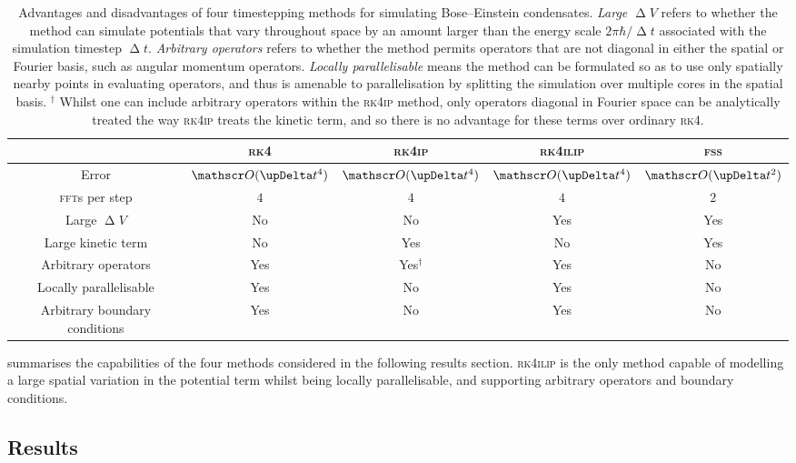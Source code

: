 \begin{table}
\renewcommand{\arraystretch}{1.5}
\setlength\heavyrulewidth{1.5pt}
\centering
\begin{tabular}[c]{ccccc}
\toprule
 & \textsc{rk4} & \textsc{rk4ip} & \textsc{rk4ilip} & \textsc{fss} \\
\midrule
Error & $\Ord{\upDelta t^4}$ & $\Ord{\upDelta t^4}$& $\Ord{\upDelta t^4}$ & $\Ord{\upDelta t^2}$\\
\textsc{fft}s per step & $4$ & $4$ & $4$ & $2$\\
Large $\upDelta V$ & No & No & Yes & Yes\\
Large kinetic term & No & Yes & No & Yes\\
Arbitrary operators & Yes & Yes$^\dagger$ & Yes & No\\
Locally parallelisable & Yes & No & Yes & No\\
Arbitrary boundary conditions & Yes & No & Yes & No\\
\bottomrule
\end{tabular}
\caption{Advantages and disadvantages of four timestepping methods for simulating Bose--Einstein condensates. \emph{Large $\upDelta V$} refers to whether the method can simulate potentials that vary throughout space by an amount larger than the energy scale $2\pi\hbar /{\upDelta t}$ associated with the simulation timestep $\upDelta t$. \emph{Arbitrary operators} refers to whether the method permits operators that are not diagonal in either the spatial or Fourier basis, such as angular momentum operators. \emph{Locally parallelisable} means the method can be formulated so as to use only spatially nearby points in evaluating operators, and thus is amenable to parallelisation by splitting the simulation over multiple cores in the spatial basis. $^\dagger$ Whilst one can include arbitrary operators within the \textsc{rk4ip} method, only operators diagonal in Fourier space can be analytically treated the way \textsc{rk4ip} treats the kinetic term, and so there is no advantage for these terms over ordinary \textsc{rk4}.}\label{table:rk4ilip_methods}
\end{table}

 summarises the capabilities of the four methods considered in the following results section. \textsc{rk4ilip} is the only method capable of modelling a large spatial variation in the potential term whilst being locally parallelisable, and supporting arbitrary operators and boundary conditions.

\subsection{Results}

